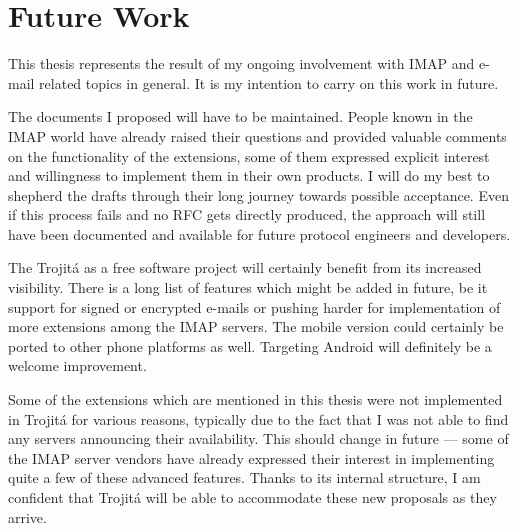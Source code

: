 \documentclass[trojita]{subfiles}
\begin{document}
\section{Future Work}
\label{sec:future-work}

This thesis represents the result of my ongoing involvement with IMAP and e-mail related topics in general.  It is my
intention to carry on this work in future.

The documents I proposed will have to be maintained.  People known in the IMAP world have already raised their questions
and provided valuable comments on the functionality of the extensions, some of them expressed explicit interest and
willingness to implement them in their own products.  I will do my best to shepherd the drafts through their long
journey towards possible acceptance.  Even if this process fails and no RFC gets directly produced, the approach will
still have been documented and available for future protocol engineers and developers.

The Trojitá as a free software project will certainly benefit from its increased visibility.  There is a long list of
features which might be added in future, be it support for signed or encrypted e-mails or pushing harder for
implementation of more extensions among the IMAP servers.  The mobile version could certainly be ported to other phone
platforms as well.  Targeting Android will definitely be a welcome improvement.

Some of the extensions which are mentioned in this thesis were not implemented in Trojitá for various reasons, typically
due to the fact that I was not able to find any servers announcing their availability.  This should change in future ---
some of the IMAP server vendors have already expressed their interest in implementing quite a few of these advanced
features.  Thanks to its internal structure, I am confident that Trojitá will be able to accommodate these new proposals
as they arrive.
\end{document}
